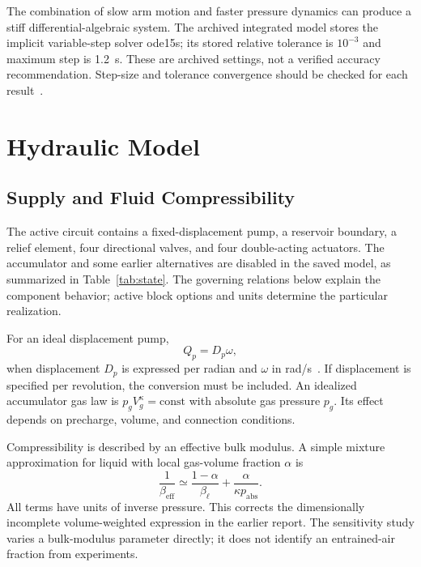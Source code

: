 \documentclass[conference,letterpaper]{IEEEtran}
\begin{document}
The combination of slow arm motion and faster pressure dynamics can produce a stiff differential-algebraic system. The archived integrated model stores the implicit variable-step solver \textnormal{ode15s}; its stored relative tolerance is $10^{-3}$ and maximum step is 1.2~s. These are archived settings, not a verified accuracy recommendation. Step-size and tolerance convergence should be checked for each result~\cite{ode15s}.



\section{Hydraulic Model}
\subsection{Supply and Fluid Compressibility}
The active circuit contains a fixed-displacement pump, a reservoir boundary, a relief element, four directional valves, and four double-acting actuators. The accumulator and some earlier alternatives are disabled in the saved model, as summarized in Table~\ref{tab:state}. The governing relations below explain the component behavior; active block options and units determine the particular realization.

For an ideal displacement pump,
\begin{equation}
Q_p=D_p\omega,
\end{equation}
when displacement $D_p$ is expressed per radian and $\omega$ in rad/s~\cite{pump}. If displacement is specified per revolution, the conversion must be included. An idealized accumulator gas law is $p_gV_g^\kappa=\mathrm{const}$ with absolute gas pressure $p_g$. Its effect depends on precharge, volume, and connection conditions.

Compressibility is described by an effective bulk modulus. A simple mixture approximation for liquid with local gas-volume fraction $\alpha$ is
\begin{equation}
\frac{1}{\beta_{\mathrm{eff}}}
\simeq\frac{1-\alpha}{\beta_\ell}
+\frac{\alpha}{\kappa p_{\mathrm{abs}}}.
\end{equation}
All terms have units of inverse pressure. This corrects the dimensionally incomplete volume-weighted expression in the earlier report. The sensitivity study varies a bulk-modulus parameter directly; it does not identify an entrained-air fraction from experiments.
\end{document}
